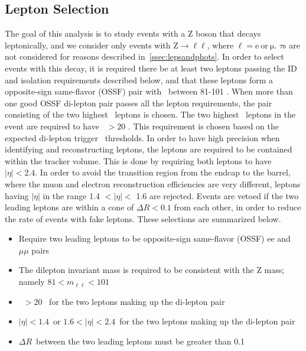 \subsection{Lepton Selection}
\label{ssec:lepsel}
The goal of this analysis is to study events with a Z boson that decays leptonically,
and we consider only events with Z$\rightarrow\ell\ell$, where $\mathrm{\ell=e~or~\mu}$.
$\tau$s are not considered for reasons described in~\ref{ssec:lepsandphots}.
In order to select events with this decay,
it is required there be at least two leptons passing the ID and isolation requirements described below,
and that these leptons form a opposite-sign same-flavor (OSSF) pair with \mll\ between 81-101 \gev.
When more than one good OSSF di-lepton pair passes all the lepton requirements,
the pair consisting of the two highest \pt\ leptons is chosen.
The two highest \pt\ leptons in the event are required to have \pt\ $> 20$ \gev.
This requirement is chosen based on the expected di-lepton trigger \pt\ thresholds.
In order to have high precision when identifying and reconstructing leptons,
the leptons are required to be contained within the tracker volume.
This is done by requiring both leptons to have $|\eta| < 2.4$.
In order to avoid the transition region from the endcap to the barrel, 
where the muon and electron reconstruction efficiencies are very different, 
leptons having $|\eta|$ in the range 1.4 $< |\eta| <$ 1.6 are rejected.
Events are vetoed if the two leading leptons are within a cone of $\Delta R < 0.1$ from each other,
in order to reduce the rate of events with fake leptons.
These selections are summarized below.

\begin{itemize}
\item Require two leading leptons to be opposite-sign same-flavor (OSSF) ee and $\mu\mu$ pairs
\item The dilepton invariant mass is required to be consistent with the Z mass; namely $81<m_{\ell\ell}<101$~\gev
\item \pt\ $> 20$ \gev\ for the two leptons making up the di-lepton pair
\item $|\eta| < 1.4$~or $1.6 < |\eta| < 2.4$~for the two leptons making up the di-lepton pair
\item $\Delta R$~between the two leading leptons must be greater than 0.1
\end{itemize}

